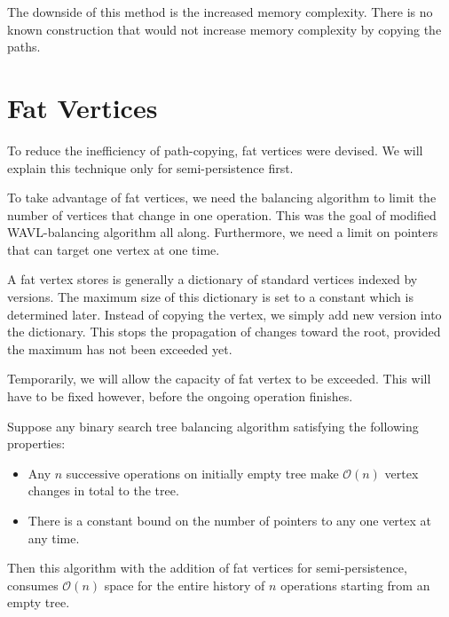 The downside of this method is the increased memory complexity. There is no known construction that would not increase memory complexity by copying the paths.

\section{Fat Vertices}

To reduce the inefficiency of path-copying, fat vertices were devised. We will explain this technique only for semi-persistence first.

To take advantage of fat vertices, we need the balancing algorithm to limit the number of vertices that change in one operation. This was the goal of modified WAVL-balancing algorithm all along. Furthermore, we need a limit on pointers that can target one vertex at one time.

A fat vertex stores is generally a dictionary of standard vertices indexed by versions. The maximum size of this dictionary is set to a constant which is determined later. Instead of copying the vertex, we simply add new version into the dictionary. This stops the propagation of changes toward the root, provided the maximum has not been exceeded yet.

Temporarily, we will allow the capacity of fat vertex to be exceeded. This will have to be fixed however, before the ongoing operation finishes.

\begin{prop}
Suppose any binary search tree balancing algorithm satisfying the following properties:
\begin{itemize}
\item 
Any $n$ successive operations on initially empty tree make $\mathcal{O}(n)$ vertex changes in total to the tree. 
\item 
There is a constant bound on the number of pointers to any one vertex at any time.
\end{itemize}
Then this algorithm with the addition of fat vertices for semi-persistence, consumes $\mathcal{O}(n)$ space for the entire history of $n$ operations starting from an empty tree.
\end{prop}

